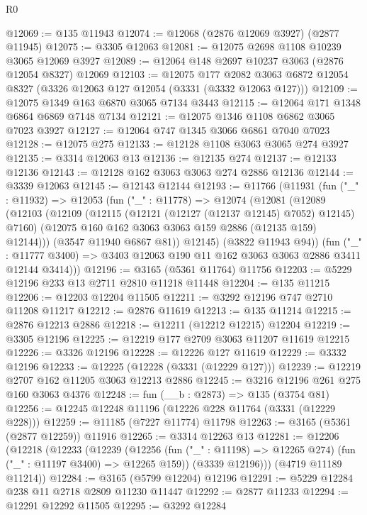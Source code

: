 \begin{lexlean}{R0}
\begin{coremodule}
@12069 := @135 @11943
@12074 := @12068 (@2876 @12069 @3927) (@2877 @11945)
@12075 := @3305 @12063
@12081 := @12075 @2698 @1108 @10239 @3065 @12069 @3927
@12089 := @12064 @148 @2697 @10237 @3063 (@2876 @12054 @8327) @12069
@12103 := @12075
    @177
    @2082
    @3063
    @6872
    @12054
    @8327
    (@3326 @12063 @127 @12054 (@3331 (@3332 @12063 @127)))
@12109 := @12075 @1349 @163 @6870 @3065 @7134 @3443
@12115 := @12064 @171 @1348 @6864 @6869 @7148 @7134
@12121 := @12075 @1346 @1108 @6862 @3065 @7023 @3927
@12127 := @12064 @747 @1345 @3066 @6861 @7040 @7023
@12128 := @12075 @275
@12133 := @12128 @1108 @3063 @3065 @274 @3927
@12135 := @3314 @12063 @13
@12136 := @12135 @274
@12137 := @12133 @12136
@12143 := @12128 @162 @3063 @3063 @274 @2886 @12136
@12144 := @3339 @12063
@12145 := @12143 @12144
@12193 := @11766
    (@11931
      (fun ("_" : @11932) =>
      @12053
        (fun ("_" : @11778) =>
        @12074
          (@12081
            (@12089
              (@12103
                (@12109
                  (@12115 (@12121 (@12127 (@12137 @12145) @7052) @12145) @7160)
                  (@12075 @160 @162 @3063 @3063 @159 @2886 (@12135 @159) @12144)))
              (@3547 @11940 @6867 @81))
            @12145)
          (@3822 @11943 @94))
        (fun ("_" : @11777 @3400) =>
        @3403 @12063 @190 @11 @162 @3063 @3063 @2886 @3411 @12144 @3414)))
@12196 := @3165 (@5361 @11764) @11756
@12203 := @5229 @12196 @233 @13 @2711 @2810 @11218 @11448
@12204 := @135 @11215
@12206 := @12203 @12204 @11505
@12211 := @3292 @12196 @747 @2710 @11208 @11217
@12212 := @2876 @11619
@12213 := @135 @11214
@12215 := @2876 @12213 @2886
@12218 := @12211 (@12212 @12215) @12204
@12219 := @3305 @12196
@12225 := @12219 @177 @2709 @3063 @11207 @11619 @12215
@12226 := @3326 @12196
@12228 := @12226 @127 @11619
@12229 := @3332 @12196
@12233 := @12225 (@12228 (@3331 (@12229 @127)))
@12239 := @12219 @2707 @162 @11205 @3063 @12213 @2886
@12245 := @3216 @12196 @261 @275 @160 @3063 @4376
@12248 := fun (__b : @2873) => @135 (@3754 @81)
@12256 := @12245 @12248 @11196 (@12226 @228 @11764 (@3331 (@12229 @228)))
@12259 := @11185 (@7227 @11774) @11798
@12263 := @3165 (@5361 (@2877 @12259)) @11916
@12265 := @3314 @12263 @13
@12281 := @12206
    (@12218
      (@12233
        (@12239
          (@12256 (fun ("_" : @11198) => @12265 @274) (fun ("_" : @11197 @3400) => @12265 @159))
          (@3339 @12196)))
      (@4719 @11189 @11214))
@12284 := @3165 (@5799 @12204) @12196
@12291 := @5229 @12284 @238 @11 @2718 @2809 @11230 @11447
@12292 := @2877 @11233
@12294 := @12291 @12292 @11505
@12295 := @3292 @12284

\end{coremodule}
\end{lexlean}
